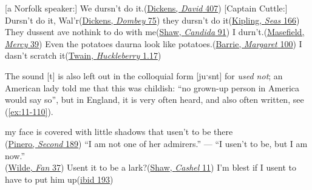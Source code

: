 \ea \label{ex:11-103}
\ea
{}[a Norfolk speaker:] We dursn't do it.\hfill(\href{https://archive.org/details/personalhistory05dickgoog/page/n181/mode/2up?q=%22dursn%27t%22&view=theater}{Dickens, \textit{David} 407}) %
\ex
{}[Captain Cuttle:] Dursn't do it, Wal'r\hfill(\href{https://archive.org/details/dombeyson00dick_0/page/122/mode/2up?q=%22dursn%27t%22&view=theater}{Dickens, \textit{Dombey} 75}) %
\z
\ex \label{ex:11-105}
\ea
they dursn't do it\hfill(\href{https://archive.org/details/sevenseas00kipl/page/144/mode/2up?view=theater&q=%22do+it%22}{Kipling, \textit{Seas} 166})
\ex
They dussent ave nothink to do with me\hfill(\href{https://archive.org/details/candidamystery02shawuoft/page/90/mode/2up?q=dussent&view=theater}{Shaw, \textit{Candida} 91})
\z
\ex \label{ex:11-107}
\ea
I durn't.\hfill(\href{https://archive.org/details/dli.ernet.2911/page/33/mode/2up?q=%22I+durn%27t%22&view=theater}{Masefield, \textit{Mercy} 39})
\ex
Even the potatoes daurna look like potatoes.\hfill(\href{https://archive.org/details/margaretogilvy00barr/page/76/mode/2up?q=daurna&view=theater}{Barrie, \textit{Margaret} 100}) %
\ex
I dasn't scratch it\hfill(\href{https://archive.org/details/adventureshuckle00twaiiala/page/22/mode/2up?q=%22dasn%27t+scratch%22&view=theater}{Twain, \textit{Huckleberry} 1.17})
\z
\z

The sound [t] is also left out in the colloquial form [juˑsnt] for \textit{used not}; an American lady told me that this was childish: ``no grown-up person in America would say so'', but in England, it is very often heard, and also often written, see (\ref{ex:11-110}).\largerpage

\ea \label{ex:11-110}
\ea
my face is covered with little shadows that usen't to be there\\\hfill(\href{https://archive.org/details/thesecondmrstanq00pineuoft/page/188/mode/2up?q=%22my+face+is+covered%22&view=theater}{Pinero, \textit{Second} 189})
\ex
``I am not one of her admirers.'' --- ``I usen't to be, but I am now.''\\\hfill(\href{https://archive.org/details/ladywindermeresf00wildrich/page/86/mode/2up?q=%22one+of+her+admirers%22&view=theater}{Wilde, \textit{Fan} 37}) %
\ex
Usent it to be a lark?\hfill(\href{https://archive.org/details/cashelbyronsprof00shawuoft/page/n37/mode/2up?q=%22usent+it+to+be+a+lark%22&view=theater}{Shaw, \textit{Cashel} 11})
\ex
I'm blest if I usent to have to put him up\hfill(\href{https://archive.org/details/cashelbyronsprof00shawuoft/page/n219/mode/2up?q=%22blest+if+i+usent%22&view=theater}{ibid 193})%

